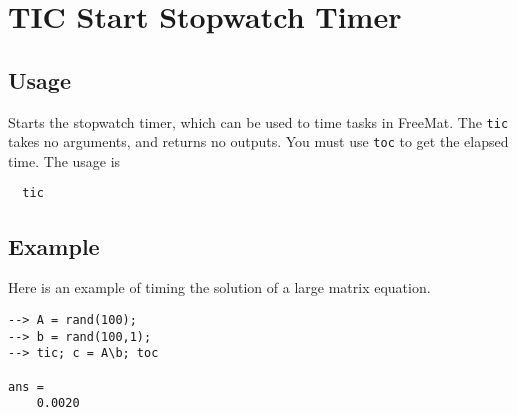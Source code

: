 \section{TIC Start Stopwatch Timer}

\subsection{Usage}

Starts the stopwatch timer, which can be used to time tasks in FreeMat.
The \verb|tic| takes no arguments, and returns no outputs.  You must use
\verb|toc| to get the elapsed time.  The usage is
\begin{verbatim}
  tic
\end{verbatim}
\subsection{Example}

Here is an example of timing the solution of a large matrix equation.
\begin{verbatim}
--> A = rand(100);
--> b = rand(100,1);
--> tic; c = A\b; toc

ans = 
    0.0020 
\end{verbatim}
